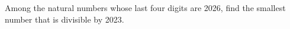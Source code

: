 Among the natural numbers whose last four digits are 2026, find the smallest number that is divisible by 2023.
